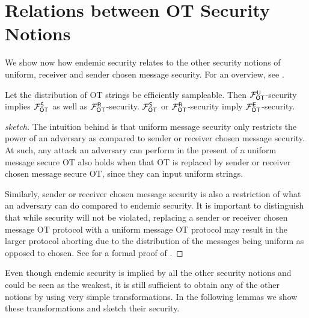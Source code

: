 \section{Relations between OT Security Notions}\label{sec:relot}

We show now how endemic security relates to the other security notions of uniform, receiver and sender chosen message security. For an overview, see .
\begin{lemma}\label{lemma:is_a}
Let the distribution of OT strings be efficiently sampleable. 
Then $\mathcal{F}_{\mathsf{OT}}^\mathsf{U}$-security implies $\mathcal{F}_{\mathsf{OT}}^{\mathsf{S}}$ as well as $\mathcal{F}_{\mathsf{OT}}^\mathsf{R}$-security. $\mathcal{F}_{\mathsf{OT}}^{\mathsf{S}}$ or $\mathcal{F}_{\mathsf{OT}}^\mathsf{R}$-security imply $\mathcal{F}_{\mathsf{OT}}^\mathsf{E}$-security.
\end{lemma}

\iffullversion

\else
\begin{proof}[sketch]
	The intuition behind   is that uniform message security only restricts the power of an adversary as compared to sender or receiver chosen message security. At such, any attack an adversary can perform in the present of a uniform message secure OT also holds when that OT is replaced by sender or receiver chosen message secure OT, since they can input uniform strings.
	
	Similarly, sender or receiver chosen message security is also a restriction of what an adversary can do compared to endemic security. It is important to distinguish that while security will not be violated, replacing a sender or receiver chosen message OT protocol with a uniform message OT protocol may result in the larger protocol aborting due to the distribution of the messages being uniform as opposed to chosen. See   for a formal proof of .\pe
\end{proof}
\fi



Even though endemic security is implied by all the other security notions and could be seen as the weakest, it is still sufficient to obtain any of the other notions by using very simple transformations. In the following lemmas we show these transformations and sketch their security.   

